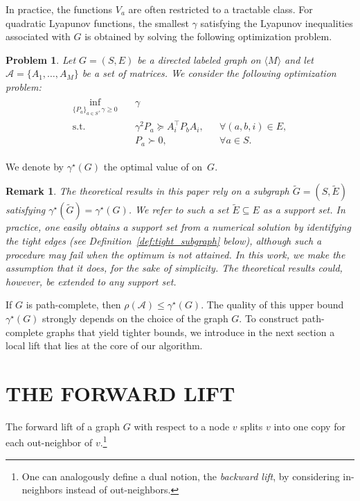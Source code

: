 \documentclass[letterpaper, 10 pt, conference]{ieeeconf}  %
\newcommand{\Mset}{\langle M\rangle}
\newtheorem{remark}{Remark}
\newtheorem{problem}{Problem}
\begin{document}
In practice, the functions $V_a$ are often restricted to a tractable
class. For quadratic Lyapunov functions, the smallest $\gamma$
satisfying the Lyapunov inequalities associated with $G$ is obtained by solving the following optimization problem.

\begin{problem}
Let $G=(S,E)$ be a directed labeled graph on $\Mset$ and let
$\mathcal A=\{A_1,\dots,A_M\}$ be a set of matrices. We consider the
following optimization problem:
\begin{align*}
\begin{aligned}
\inf_{\{P_a\}_{a\in S}, \gamma\ge 0} \quad & \gamma \\[1mm]
\text{s.t.} \quad
& \gamma^2 P_a \succeq A_i^\top P_b A_i, && \forall (a,b,i)\in E, \\[1mm]
& P_a \succ 0, && \forall a\in S .
\end{aligned}
\end{align*}
\label{prob:graph_opt}
\end{problem}

We denote by $\gamma^\star(G)$ the optimal value of
 on~$G$. 
\begin{remark}
The theoretical results in this paper rely on a subgraph
$\tilde G=(S,\tilde E)$ satisfying
$\gamma^\star(\tilde G)=\gamma^\star(G)$. We refer to such a set
$\tilde E\subseteq E$ as a \emph{support set}. In practice, one easily obtains a support set from a numerical solution by identifying the tight edges (see Definition~\ref{def:tight_subgraph} below), although such a procedure may fail when the optimum is not attained. In this work, we make the assumption that it does, for the sake of simplicity. The theoretical results could, however, be extended to any support set.
\end{remark}

If $G$ is path-complete, then
$
\rho(\mathcal A) \le \gamma^\star(G)
$. The quality of this upper bound $\gamma^\star(G)$ strongly depends on the
choice of the graph $G$. To construct path-complete graphs that yield tighter bounds,
we introduce in the next section a local lift that lies at the core of our algorithm.

\section{THE FORWARD LIFT}\label{sec:lifting}
The forward lift of a graph $G$ with respect to a node $v$ splits $v$ into one copy
for each out-neighbor of $v$.\footnote{One can analogously define a dual notion, the \emph{backward lift}, by considering in-neighbors instead of out-neighbors.}
\end{document}
